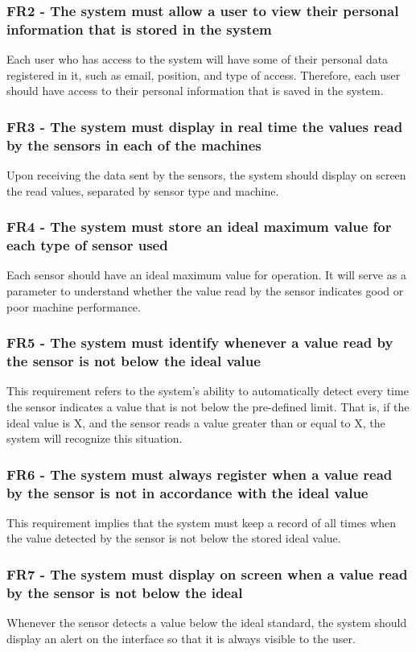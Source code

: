 \subsubsection{FR2 - The system must allow a user to view their personal information that is stored in the system}
Each user who has access to the system will have some of their personal data registered in it, such as email, position, and type of access. Therefore, each user should have access to their personal information that is saved in the system.

\subsubsection{FR3 - The system must display in real time the values read by the sensors in each of the machines}Upon receiving the data sent by the sensors, the system should display on screen the read values, separated by sensor type and machine.

\subsubsection{FR4 - The system must store an ideal maximum value for each type of sensor used}
Each sensor should have an ideal maximum value for operation. It will serve as a parameter to understand whether the value read by the sensor indicates good or poor machine performance.

\subsubsection{FR5 - The system must identify whenever a value read by the sensor is not below the ideal value}
This requirement refers to the system's ability to automatically detect every time the sensor indicates a value that is not below the pre-defined limit. That is, if the ideal value is X, and the sensor reads a value greater than or equal to X, the system will recognize this situation.

\subsubsection{FR6 - The system must always register when a value read by the sensor is not in accordance with the ideal value}
This requirement implies that the system must keep a record of all times when the value detected by the sensor is not below the stored ideal value.

\subsubsection{FR7 - The system must display on screen when a value read by the sensor is not below the ideal}
Whenever the sensor detects a value below the ideal standard, the system should display an alert on the interface so that it is always visible to the user.

